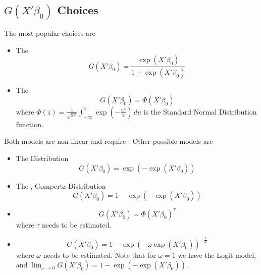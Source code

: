 \subsection{$G(X'\beta_0)$ Choices}
The most popular choices are
\begin{itemize}
    \item The 
    \begin{equation}
        G(X'\beta_0) = \frac{\exp(X'\beta_0)}{1+\exp(X'\beta_0)}
    \end{equation}
    \item The 
    \begin{equation}
        G(X'\beta_0) = \Phi(X'\beta_0)
    \end{equation}
    where $\Phi(z)=\frac{1}{\sqrt{2\pi}}\int_{-\infty}^{z}\exp(-\frac{u^2}{2})\,du$ is the Standard Normal Distribution function.
\end{itemize}
Both models are non-linear and require . Other possible models are
\begin{itemize}
    \item The  Distribution
    \begin{equation*}
        G(X'\beta_0) = \exp(-\exp(X'\beta_0))
    \end{equation*}
    \item The , Gompertz Distribution
    \begin{equation*}
        G(X'\beta_0) = 1- \exp(-\exp(X'\beta_0))
    \end{equation*}
    \item \begin{equation*}
        G(X'\beta_0) = \Phi(X'\beta_0)^{\tau}
        \end{equation*}
    where $\tau$ needs to be estimated.
    \item \begin{equation*}
        G(X'\beta_0) = 1- \exp(-\omega\exp(X'\beta_0))^{-\frac{1}{\omega}}
    \end{equation*}
    where $\omega$ needs to be estimated. 
    Note that for $\omega = 1$ we have the Logit model, 
    and $\lim_{\omega\to 0}G(X'\beta_0) = 1- \exp(-\exp(X'\beta_0))$.
\end{itemize}
\\

